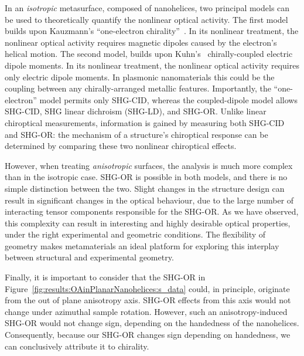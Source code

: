 In an \textit{isotropic} metasurface, composed of nanohelices, two principal models can be used to theoretically quantify the nonlinear optical activity. The first model builds upon Kauzmann's ``one-electron chirality''~\cite{Kauzmann1957a}.
In its nonlinear treatment, the nonlinear optical activity requires magnetic dipoles caused by the electron's helical motion.\cite{Hache2001a}
The second model, builds upon Kuhn's~\cite{Kuhn1930} chirally-coupled electric dipole moments. In its nonlinear treatment, the nonlinear optical activity requires only electric dipole moments.\cite{Hache2001a}
In plasmonic nanomaterials this could be the coupling between any chirally-arranged metallic features. Importantly, the ``one-electron'' model permits only SHG-CID, whereas the coupled-dipole model allows SHG-CID, SHG linear dichroism (SHG-LD), and SHG-OR.\cite{Fischer2005a}
Unlike linear chiroptical measurements, information is gained by measuring both SHG-CID and SHG-OR: the mechanism of a structure's chiroptical response can be determined by comparing these two nonlinear chiroptical effects. 

However, when treating \textit{anisotropic} surfaces, the analysis is much more complex than in the isotropic case. SHG-OR is possible in both models, and there is no simple distinction between the two. Slight changes in the structure design can result in significant changes in the optical behaviour, due to the large number of interacting tensor components responsible for the SHG-OR. As we have observed, this complexity can result in interesting and highly desirable optical properties, under the right experimental and geometric conditions. The flexibility of geometry makes metamaterials an ideal platform for exploring this interplay between structural and experimental geometry. 

Finally, it is important to consider that the SHG-OR in Figure~\ref{fig:results:OAinPlanarNanohelices:s_data} could, in principle, originate from the out of plane anisotropy axis. SHG-OR effects from this axis would not change under azimuthal sample rotation. However, such an anisotropy-induced SHG-OR would not change sign, depending on the handedness of the nanohelices. Consequently, because our SHG-OR changes sign depending on handedness, we can conclusively attribute it to chirality. 

